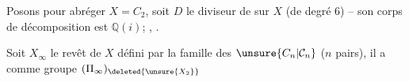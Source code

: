 Posons pour abréger $X=C_2$, soit $D$ le diviseur de
 sur $X$ (de degré 6) -- son corps de
décomposition est $\mathbb Q(i)$; ,
.

Soit $X_\infty$ le revêt   de $X$ défini par
la famille des $\unsure{C_n|\mathcal C_n}$ ($n$ pairs), il a comme
groupe $(\Pi_\infty)_{\deleted{\unsure{X_2}}}$
